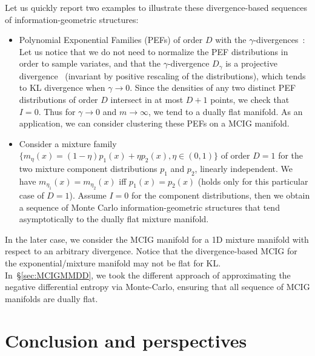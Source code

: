 \documentclass[graybox]{svmult}
\begin{document}
Let us quickly report two examples to illustrate these divergence-based sequences of information-geometric structures:

\begin{itemize}
	\item Polynomial Exponential Families (PEFs) of order $D$ with the $\gamma$-divergences~\cite{gammadiv-2014}: 
	Let us notice that we do not need to normalize the PEF
        distributions in order to sample variates, and that the
        $\gamma$-divergence $D_\gamma$ is a projective
        divergence~\cite{Holder-2017} (invariant by positive rescaling
        of the distributions), which tends to KL divergence when $\gamma\rightarrow 0$. 
	Since the densities of any two distinct PEF distributions of order $D$ intersect in at most $D+1$ points, we check that $I=0$.
	Thus for $\gamma\rightarrow 0$ and $m\rightarrow \infty$, we tend to a dually flat manifold.
	As an application, we can consider clustering these PEFs on a MCIG manifold.
	
	\item Consider a mixture family $\{m_\eta(x)=(1-\eta)p_1(x)+\eta p_2(x), \eta\in (0,1)\}$ of order $D=1$ for the two mixture component distributions $p_1$ and $p_2$, linearly independent. 
	We have $m_{\eta_1}(x)=m_{\eta_2}(x)$ iff $p_1(x)=p_2(x)$ (holds only for this particular case of $D=1$).
	Assume $I=0$ for the component distributions, then we obtain a sequence of Monte Carlo information-geometric structures that tend
	asymptotically to the dually flat mixture manifold.
\end{itemize}

In the later case, we consider the MCIG manifold for a 1D mixture manifold with respect to an arbitrary divergence.
Notice that the divergence-based MCIG for the exponential/mixture manifold  may not be flat for KL. 
In~\S\ref{sec:MCIGMMDD}, we took the different approach of approximating the negative differential entropy via Monte-Carlo, ensuring that all sequence of MCIG manifolds are dually flat.


\section{Conclusion and perspectives}\label{sec:concl}

%
\end{document}
